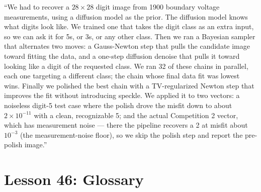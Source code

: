 \documentclass[11pt]{article}
\begin{document}
\begin{intuition}
``We had to recover a $28 \times 28$ digit image from 1900 boundary
voltage measurements, using a diffusion model as the prior. The
diffusion model knows what digits look like. We trained one that takes
the digit class as an extra input, so we can ask it for 5s, or 3s, or
any other class. Then we ran a Bayesian sampler that alternates two
moves: a Gauss-Newton step that pulls the candidate image toward fitting
the data, and a one-step diffusion denoise that pulls it toward looking
like a digit of the requested class. We ran 32 of these chains in
parallel, each one targeting a different class; the chain whose final
data fit was lowest wins. Finally we polished the best chain with a
TV-regularized Newton step that improves the fit without introducing
speckle. We applied it to two vectors: a noiseless digit-5 test case
where the polish drove the misfit down to about $2 \times 10^{-11}$
with a clean, recognizable 5; and the actual Competition 2 vector,
which has measurement noise --- there the pipeline recovers a 2 at
misfit about $10^{-3}$ (the measurement-noise floor), so we skip the
polish step and report the pre-polish image.''
\end{intuition}

\section{Lesson 46: Glossary}
\end{document}
